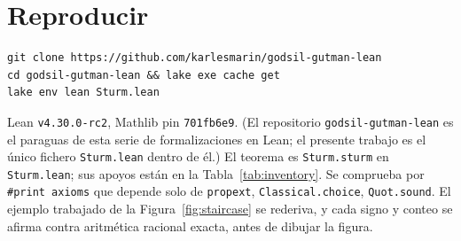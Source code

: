 \documentclass[11pt]{article}
\newcommand{\lean}[1]{\texttt{#1}}
\begin{document}
\section*{Reproducir}
\begin{verbatim}
git clone https://github.com/karlesmarin/godsil-gutman-lean
cd godsil-gutman-lean && lake exe cache get
lake env lean Sturm.lean
\end{verbatim}
Lean \lean{v4.30.0-rc2}, Mathlib pin \lean{701fb6e9}. (El repositorio
\texttt{godsil-gutman-lean} es el paraguas de esta serie de formalizaciones en Lean; el presente
trabajo es el \'unico fichero \lean{Sturm.lean} dentro de \'el.) El teorema es \lean{Sturm.sturm} en
\lean{Sturm.lean}; sus apoyos est\'an en la Tabla~\ref{tab:inventory}. Se comprueba por \lean{\#print
axioms} que depende solo de \lean{propext}, \lean{Classical.choice}, \lean{Quot.sound}. El ejemplo
trabajado de la Figura~\ref{fig:staircase} se rederiva, y cada signo y conteo se afirma contra
aritm\'etica racional exacta, antes de dibujar la figura.
\end{document}
